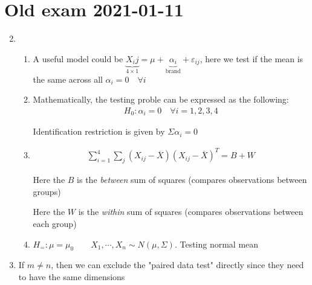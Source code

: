 \section{Old exam 2021-01-11}

\begin{enumerate}[label=\arabic*., leftmargin=*]
  \setcounter{enumi}{1}
  \item
  \begin{enumerate}[label=\alph*),leftmargin=*]
    \item A useful model could  be $\underbrace{X_ij}_{4\times 1} = \mu+\underbrace{\alpha_i}_{\text{brand}}+\varepsilon_{ij}$, here we test if the mean is the same across all $\alpha_i = 0\quad\forall i$
      \par\bigskip
    \item Mathematically, the testing proble can be expressed as the following:
      \begin{equation*}
        \begin{gathered}
          H_0:\alpha_i = 0\quad\forall i = 1,2,3,4
        \end{gathered}
      \end{equation*}
      \par\bigskip
      \noindent Identification restriction is given by $\Sigma\alpha_i = 0$
      \par\bigskip
    \item
      \begin{equation*}
        \begin{gathered}
          \sum_{i=1}^{4}\sum_{j}(X_{ij}-\overline{X})(X_{ij}-\overline{X})^T =B+W
        \end{gathered}
      \end{equation*}
      \par\bigskip
      \noindent Here the $B$ is the \textit{between } sum of squares (compares observations between groups)\par
      \noindent Here the $W$ is the \textit{within} sum of squares (compares observations between each group)
      \par\bigskip
    \item $H_=:\mu=\mu_0\qquad X_1,\cdots,X_n\sim N(\mu,\Sigma)$. Testing normal mean
  \end{enumerate}
  \par\bigskip
\item If $m\neq n$, then we can exclude the "paired data test" directly since they need to have the same dimensions 
  \par\bigskip

\end{enumerate}
